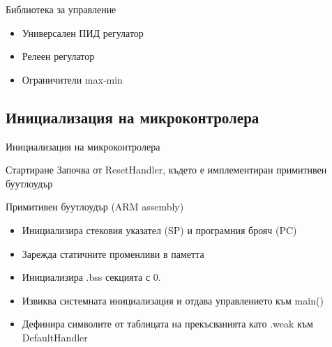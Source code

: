 \documentclass[handout]{beamer}
\begin{document}
\begin{frame}[t]
	\begin{block}{Библиотека за управление}
		\begin{itemize}
			\pause
			\item Универсален ПИД регулатор
			\pause
			\item Релеен регулатор
			\pause
			\item Ограничители max-min
		\end{itemize}
	\end{block}

\end{frame}

\subsection{Инициализация на микроконтролера}

\begin{frame}{Инициализация на микроконтролера}

	\begin{block}{Стартиране}
		Започва от ResetHandler, където е  имплементиран примитивен буутлоудър
	\end{block}

\end{frame}

\begin{frame}[t]

	\begin{block}{Примитивен буутлоудър (ARM assembly)}
		\begin{itemize}
			\item Инициализира стековия указател (SP) и програмния брояч (PC)
			\item Зарежда статичните променливи в паметта
			\item Инициализира .bss секцията с 0.
			\item Извиква системната инициализация и отдава управлението към main()
			\item Дефинира символите от таблицата на прекъсванията като .weak към DefaultHandler 
		\end{itemize}
	\end{block}
\end{frame}
\end{document}
